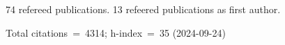 74 refereed publications. 13 refeered publications as first author.

Total citations~=~4314; h-index~=~35 (2024-09-24)
